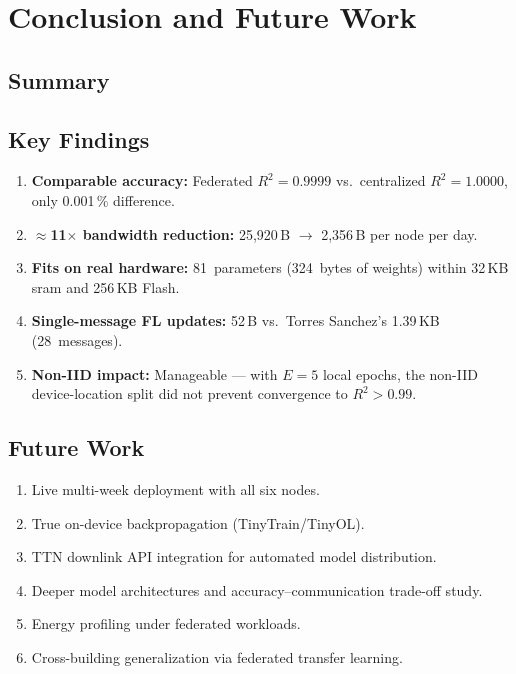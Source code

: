 \documentclass[12pt, a4paper, twoside, openright]{report}
\begin{document}
\chapter{Conclusion and Future Work}
\label{ch:conclusion}

\section{Summary}

\section{Key Findings}
\begin{enumerate}
  \item \textbf{Comparable accuracy:} Federated $R^2 = 0.9999$ vs.\ centralized $R^2 = 1.0000$, only 0.001\,\% difference.
  \item \textbf{$\approx$11$\times$ bandwidth reduction:} 25{,}920\,B $\to$ 2{,}356\,B per node per day.
  \item \textbf{Fits on real hardware:} 81~parameters (324~bytes of weights) within 32\,KB \gls{sram} and 256\,KB Flash.
  \item \textbf{Single-message FL updates:} 52\,B vs.\ Torres Sanchez's 1.39\,KB (28~messages).
  \item \textbf{Non-IID impact:} Manageable --- with $E=5$ local epochs, the non-IID device-location split did not prevent convergence to $R^2 > 0.99$.
\end{enumerate}

\section{Future Work}
\begin{enumerate}
  \item Live multi-week deployment with all six nodes.
  \item True on-device backpropagation (TinyTrain/TinyOL).
  \item TTN downlink API integration for automated model distribution.
  \item Deeper model architectures and accuracy--communication trade-off study.
  \item Energy profiling under federated workloads.
  \item Cross-building generalization via federated transfer learning.
\end{enumerate}
\end{document}
